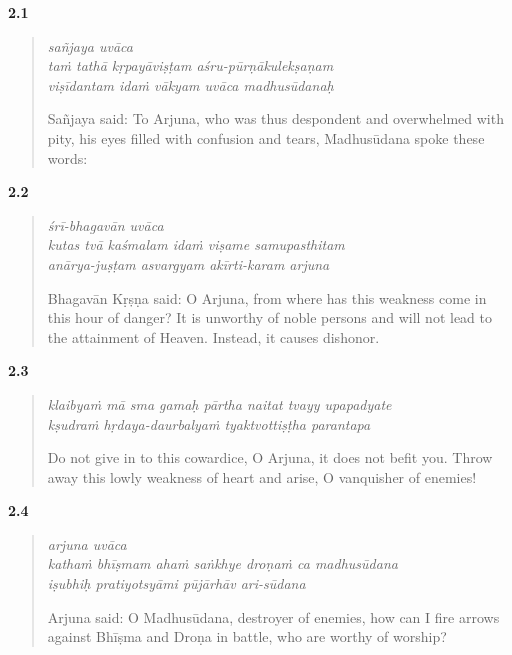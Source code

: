 \par\noindent\textbf{2.1}\par
\begin{verse}
\textit{sañjaya uvāca} \\
\textit{taṁ tathā kṛpayāviṣṭam aśru-pūrṇākulekṣaṇam} \\
\textit{viṣīdantam idaṁ vākyam uvāca madhusūdanaḥ}

\noindent Sañjaya said: To Arjuna, who was thus despondent and overwhelmed with pity, his eyes filled with confusion and tears, Madhusūdana spoke these words:
\end{verse}
\par



\par\noindent\textbf{2.2}\par
\begin{verse}
\textit{śrī-bhagavān uvāca} \\
\textit{kutas tvā kaśmalam idaṁ viṣame samupasthitam} \\
\textit{anārya-juṣṭam asvargyam akīrti-karam arjuna}

\noindent Bhagavān Kṛṣṇa said: O Arjuna, from where has this weakness come in this hour of danger? It is unworthy of noble persons and will not lead to the attainment of Heaven. Instead, it causes dishonor.
\end{verse}
\par



\par\noindent\textbf{2.3}\par
\begin{verse}
\textit{klaibyaṁ mā sma gamaḥ pārtha naitat tvayy upapadyate} \\
\textit{kṣudraṁ hṛdaya-daurbalyaṁ tyaktvottiṣṭha parantapa}

\noindent Do not give in to this cowardice, O Arjuna, it does not befit you. Throw away this lowly weakness of heart and arise, O vanquisher of enemies!
\end{verse}
\par



\par\noindent\textbf{2.4}\par
\begin{verse}
\textit{arjuna uvāca} \\
\textit{kathaṁ bhīṣmam ahaṁ saṅkhye droṇaṁ ca madhusūdana} \\
\textit{iṣubhiḥ pratiyotsyāmi pūjārhāv ari-sūdana}

\noindent Arjuna said: O Madhusūdana, destroyer of enemies, how can I fire arrows against Bhīṣma and Droṇa in battle, who are worthy of worship?
\end{verse}
\par



